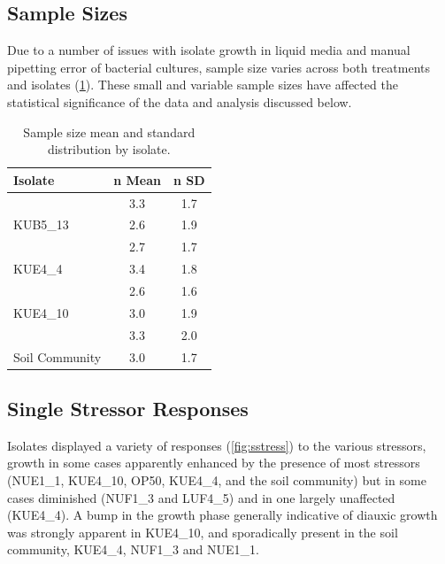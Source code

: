 \documentclass[final,1p,times]{elsarticle}
\begin{document}
\subsection{Sample Sizes}
\label{S:3:2}

Due to a number of issues with isolate growth in liquid media and manual pipetting error of bacterial cultures, sample size varies across both treatments and isolates (\cref{tab:samples}). These small and variable sample sizes have affected the statistical significance of the data and analysis discussed below.

\begin{table}[ht]
\centering
\small
\begin{tabular}{l c c}
\toprule 
\textbf{Isolate} & \textbf{n Mean} & \textbf{n SD}  \\
\midrule
\rowcolor{gggrey}{LUF4\_5} & 3.3 & 1.7 \\
{KUB5\_13} & 2.6 & 1.9 \\
\rowcolor{gggrey}{NUF1\_3} & 2.7 & 1.7\\
{KUE4\_4} & 3.4 & 1.8\\
\rowcolor{gggrey}{NUE1\_1} & 2.6 & 1.6\\
{KUE4\_10} & 3.0 & 1.9 \\
\rowcolor{gggrey}{OP50} & 3.3 & 2.0 \\
{Soil Community} & 3.0 & 1.7\\
\bottomrule
\end{tabular}
\caption{Sample size mean and standard distribution by isolate.}
\label{tab:samples}
\end{table}

\newpage
\subsection{Single Stressor Responses}
\label{S:3:3}

Isolates displayed a variety of responses (\cref{fig:sstress}) to the various stressors, growth in some cases apparently enhanced by the presence of most stressors (NUE1\_1, KUE4\_10, OP50, KUE4\_4, and the soil community) but in some cases diminished (NUF1\_3 and LUF4\_5) and in one largely unaffected (KUE4\_4). A bump in  the growth phase generally indicative of diauxic growth was strongly apparent in KUE4\_10, and sporadically present in the soil community, KUE4\_4, NUF1\_3 and NUE1\_1. 
\end{document}
